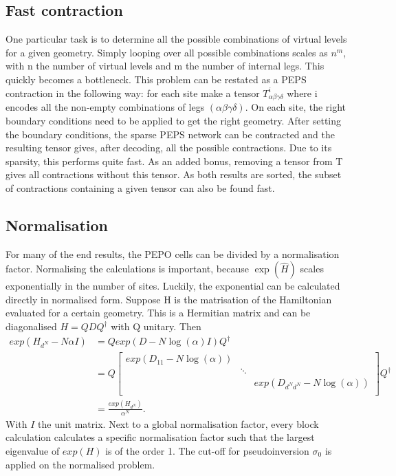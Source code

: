 \subsection{Fast contraction}

One particular task is to determine all the possible combinations of virtual levels for a given geometry. Simply looping over all possible combinations scales as $n^m$, with n the number of virtual levels and m the number of internal legs. This quickly becomes a bottleneck.
This problem can be restated as a \Gls{PEPS} contraction in the following way: for each site make a tensor $ T^{i}_{  \alpha \beta \gamma \delta } $ where i encodes all the non-empty combinations of legs $(\alpha \beta \gamma \delta)$. On each site, the right boundary conditions need to be applied to get the right geometry. After setting the boundary conditions, the sparse \Gls{PEPS} network can be contracted and the resulting tensor gives, after decoding, all the possible contractions. Due to its sparsity, this performs quite fast.
As an added bonus, removing a tensor from T gives all contractions without this tensor. As both results are sorted, the subset of contractions containing a given tensor can also be found fast.

\subsection{Normalisation}\label{subsec:nf}

For many of the end results, the PEPO cells can be divided by a normalisation factor. Normalising the calculations is important, because $\exp( \hat{H})$ scales exponentially in the number of sites. Luckily, the exponential can be calculated directly in normalised form. Suppose H is the matrisation of the Hamiltonian evaluated for a certain geometry. This is a Hermitian matrix and can be diagonalised $H= Q D Q^{\dagger}$ with Q unitary. Then
\begin{align}
    exp(  H_{d^N} - N \alpha I  ) & =  Q exp(  D- N \log(\alpha ) I    ) Q^{\dagger} \\
                                  & =  Q \begin{bmatrix} exp(D_{1 1} - N \log(\alpha )) &        &                                     \\
                                               & \ddots &                                     \\
                                               &        & exp(D_{ d^N d^N} - N \log(\alpha )) \\
    \end{bmatrix}  Q^{\dagger}     \\
                                  & = \frac{  exp(  H_{d^N} ) }{ \alpha^N }.
\end{align}
With $I$ the unit matrix. Next to a global normalisation factor, every block calculation calculates a specific normalisation factor such that the largest eigenvalue of $exp(H)$ is of the order 1. The cut-off for pseudoinversion $\sigma_0$ is applied on the normalised problem.

